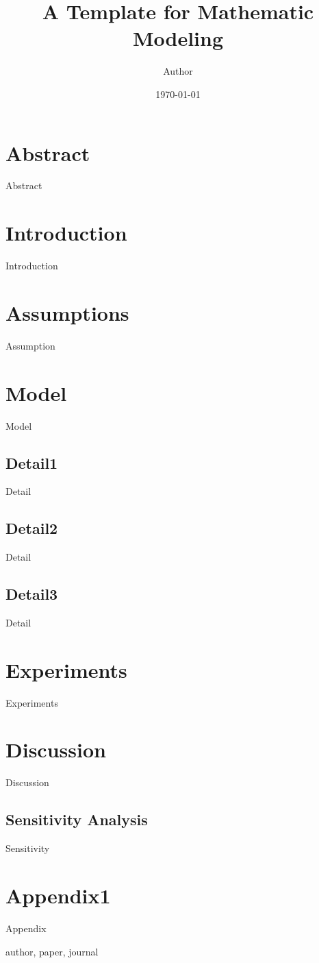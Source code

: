 \documentclass[a4paper,12pt]{article}
\title{A Template for Mathematic Modeling}
\author{Author}
\date{\today}
\begin{document}
\pagestyle{fancy}

\maketitle


\section*{Abstract}
Abstract

\section{Introduction}
Introduction

\section{Assumptions}
Assumption

\section{Model}
Model

\subsection{Detail1}
Detail

\subsection{Detail2}
Detail

\subsection{Detail3}
Detail

\section{Experiments}
Experiments

\section{Discussion}
Discussion

\subsection{Sensitivity Analysis}
Sensitivity

\appendix

\section{Appendix1}
Appendix

\begin{thebibliography}{10}
 author, paper, journal
\end{thebibliography}
\end{document}
